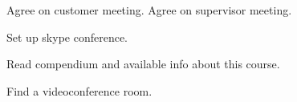 \nextItem
Agree on customer meeting. 
\nextItem
Agree on supervisor meeting.

\nextItem
Set up skype conference. 

\nextItem
Read compendium and available info about this course. 

\nextItem
Find a videoconference room. 
